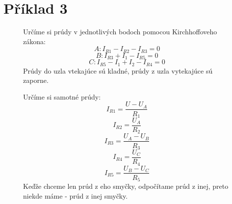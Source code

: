 \section{Příklad 3}

\begin{figure}[!ht]
\begin{center}
    Určíme si prúdy v jednotlivých bodoch pomocou Kirchhoffoveho zákona:
    \[
        A: I_{R1} - I_{R2} - I_{R3} = 0
    \]
    \[
        B: I_{R3} + I_1 - I_{R5} = 0
    \]
    \[
        C: I_{R5} - I_1 + I_2 - I_{R4} = 0
    \]
    Prúdy do uzla vtekajúce sú kladné, prúdy z uzla vytekajúce sú zaporne.
    
    Určíme si samotné prúdy:
    \[
        I_{R1} = \frac{U - U_A}{R_1}
    \]
    \[
        I_{R2} = \frac{U_A}{R_2}
    \]
    \[
        I_{R3} = \frac{U_A - U_B}{R_3}
    \]
    \[
        I_{R4} = \frac{U_C}{R_4}
    \]
    \[
        I_{R5} = \frac{U_B - U_C}{R_5}
    \]
    Keďže chceme len prúd  z eho smyčky, odpočítame prúd z inej, preto niekde máme - prúd z inej smyčky.
\end{center}
\end{figure}
